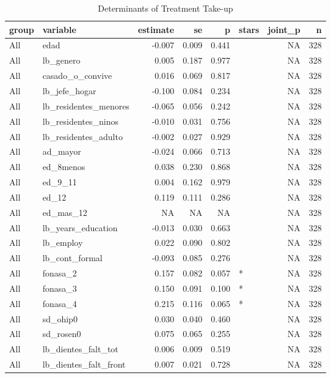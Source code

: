 \begin{table}

\caption{Determinants of Treatment Take-up}
\centering
\begin{tabular}[t]{llrrrlrr}
\toprule
group & variable & estimate & se & p & stars & joint\_p & n\\
\midrule
All & edad & -0.007 & 0.009 & 0.441 &  & NA & 328\\
All & lb\_genero & 0.005 & 0.187 & 0.977 &  & NA & 328\\
All & casado\_o\_convive & 0.016 & 0.069 & 0.817 &  & NA & 328\\
All & lb\_jefe\_hogar & -0.100 & 0.084 & 0.234 &  & NA & 328\\
All & lb\_residentes\_menores & -0.065 & 0.056 & 0.242 &  & NA & 328\\
\addlinespace
All & lb\_residentes\_ninos & -0.010 & 0.031 & 0.756 &  & NA & 328\\
All & lb\_residentes\_adulto & -0.002 & 0.027 & 0.929 &  & NA & 328\\
All & ad\_mayor & -0.024 & 0.066 & 0.713 &  & NA & 328\\
All & ed\_8menos & 0.038 & 0.230 & 0.868 &  & NA & 328\\
All & ed\_9\_11 & 0.004 & 0.162 & 0.979 &  & NA & 328\\
\addlinespace
All & ed\_12 & 0.119 & 0.111 & 0.286 &  & NA & 328\\
All & ed\_mas\_12 & NA & NA & NA &  & NA & 328\\
All & lb\_years\_education & -0.013 & 0.030 & 0.663 &  & NA & 328\\
All & lb\_employ & 0.022 & 0.090 & 0.802 &  & NA & 328\\
All & lb\_cont\_formal & -0.093 & 0.085 & 0.276 &  & NA & 328\\
\addlinespace
All & fonasa\_2 & 0.157 & 0.082 & 0.057 & * & NA & 328\\
All & fonasa\_3 & 0.150 & 0.091 & 0.100 & * & NA & 328\\
All & fonasa\_4 & 0.215 & 0.116 & 0.065 & * & NA & 328\\
All & sd\_ohip0 & 0.030 & 0.040 & 0.460 &  & NA & 328\\
All & sd\_rosen0 & 0.075 & 0.065 & 0.255 &  & NA & 328\\
\addlinespace
All & lb\_dientes\_falt\_tot & 0.006 & 0.009 & 0.519 &  & NA & 328\\
All & lb\_dientes\_falt\_front & 0.007 & 0.021 & 0.728 &  & NA & 328\\

\end{tabular}
\end{table}
